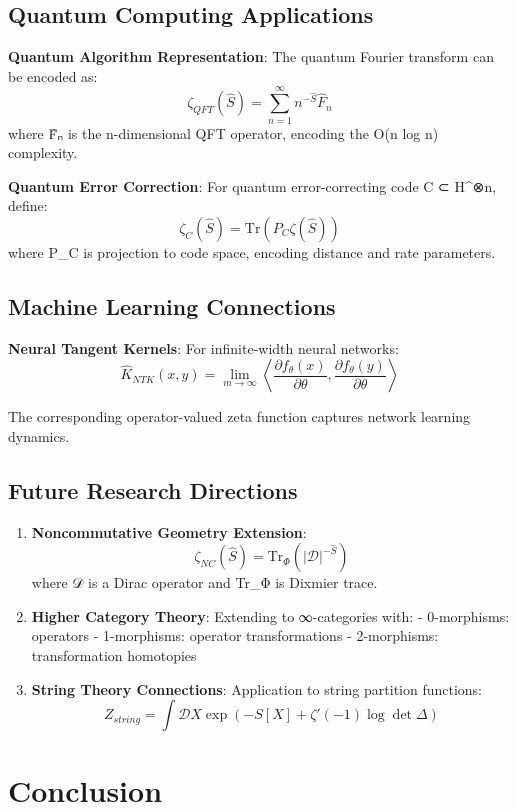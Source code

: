\documentclass[12pt]{article}
\theoremstyle{plain}
\theoremstyle{definition}
\begin{document}
\subsection{Quantum Computing Applications}

\textbf{Quantum Algorithm Representation}: The quantum Fourier transform can be encoded as:
$$\zeta_{QFT}(\hat{S}) = \sum_{n=1}^{\infty} n^{-\hat{S}} \hat{F}_n$$
where F̂ₙ is the n-dimensional QFT operator, encoding the O(n log n) complexity.

\textbf{Quantum Error Correction}: For quantum error-correcting code C ⊂ H^⊗n, define:
$$\zeta_C(\hat{S}) = \text{Tr}(P_C \zeta(\hat{S}))$$
where P_C is projection to code space, encoding distance and rate parameters.

\subsection{Machine Learning Connections}

\textbf{Neural Tangent Kernels}: For infinite-width neural networks:
$$\hat{K}_{NTK}(x, y) = \lim_{m \to \infty} \left\langle \frac{\partial f_\theta(x)}{\partial \theta}, \frac{\partial f_\theta(y)}{\partial \theta} \right\rangle$$

The corresponding operator-valued zeta function captures network learning dynamics.

\subsection{Future Research Directions}

\begin{enumerate}
\item \textbf{Noncommutative Geometry Extension}:
$$\zeta_{NC}(\hat{S}) = \text{Tr}_{\Phi}(|\mathcal{D}|^{-\hat{S}})$$
where 𝒟 is a Dirac operator and Tr_Φ is Dixmier trace.

\item \textbf{Higher Category Theory}: Extending to ∞-categories with:
- 0-morphisms: operators
- 1-morphisms: operator transformations
- 2-morphisms: transformation homotopies

\item \textbf{String Theory Connections}: Application to string partition functions:
$$Z_{string} = \int \mathcal{D}X \exp\left(-S[X] + \zeta'(-1) \log \det \Delta\right)$$
\end{enumerate}

\section{Conclusion}
\end{document}
